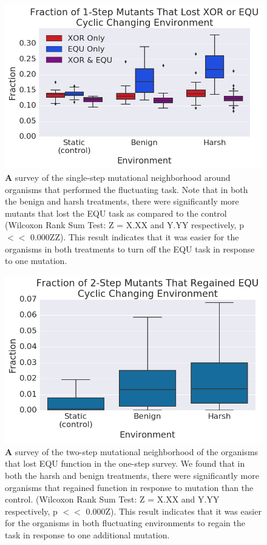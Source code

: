 \documentclass[PhD]{msu-thesis}
\begin{document}
\begin{figure}[!h] %
\includegraphics[trim={0.2cm 0 0 0.2cm},clip,width=0.75\columnwidth]{figures/CE/CCE_frac_1step__box.png}
\caption{{\textbf A survey of the single-step mutational neighborhood} around organisms that performed the fluctuating task. Note that in both the benign and harsh treatments, there were significantly more mutants that lost the EQU task as compared to the control (Wilcoxon Rank Sum Test: Z = X.XX and Y.YY respectively, p $<<$ 0.000ZZ). This result indicates that it was easier for the organisms in both treatments to turn off the EQU task in response to one mutation. %
}\label{fig:CCE_single_step}

\end{figure}
\begin{figure}[!h] %
\includegraphics[trim={0.2cm 0 0.4cm 0.25cm},clip,width=0.75\columnwidth]{figures/CE/CCE_frac_2step__box.png}
\caption{{\textbf A survey of the two-step mutational neighborhood} of the organisms that lost EQU function in the one-step survey. We found that in both the harsh and benign treatments, there were significantly more organisms that regained function in response to mutation than the control. (Wilcoxon Rank Sum Test: Z = X.XX and Y.YY respectively, p $<<$ 0.000Z). This result indicates that it was easier for the organisms in both fluctuating environments to regain the task in response to one additional mutation.
}\label{fig:CCE_two_step}
\end{figure}
\end{document}

